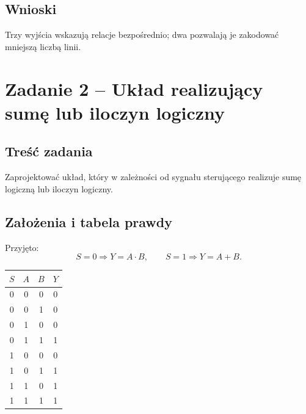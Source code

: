 \documentclass[12pt,a4paper]{article}
\begin{document}
\subsection{Wnioski}
Trzy wyjścia wskazują relacje bezpośrednio; dwa pozwalają je zakodować mniejszą liczbą linii.
\section{Zadanie 2 -- Układ realizujący sumę lub iloczyn logiczny}
\subsection{Treść zadania}
Zaprojektować układ, który w zależności od sygnału sterującego realizuje sumę logiczną lub iloczyn logiczny.
\subsection{Założenia i tabela prawdy}
Przyjęto:
\[
S=0\Rightarrow Y=A\cdot B,\qquad S=1\Rightarrow Y=A+B.
\]
\begin{center}
\begin{tabular}{ccc|c}
\toprule
$S$&$A$&$B$&$Y$\\
\midrule
0&0&0&0\\
0&0&1&0\\
0&1&0&0\\
0&1&1&1\\
1&0&0&0\\
1&0&1&1\\
1&1&0&1\\
1&1&1&1\\
\bottomrule
\end{tabular}
\end{center}
\end{document}
